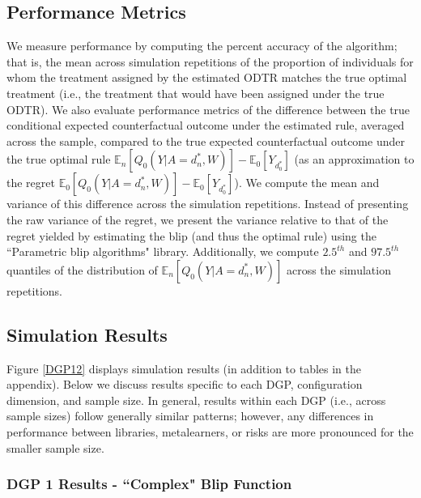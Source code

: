 \documentclass[a4paper,12pt]{article}
\begin{document}
\subsection{Performance Metrics}
We measure performance by computing the percent accuracy of the algorithm; that is, the mean across simulation repetitions of the proportion of individuals for whom the treatment assigned by the estimated ODTR matches the true optimal treatment (i.e., the treatment that would have been assigned under the true ODTR). We also evaluate performance metrics of the difference between the true conditional expected counterfactual outcome under the estimated rule, averaged across the sample, compared to the true expected counterfactual outcome under the true optimal rule  $\mathbb{E}_n[Q_0(Y|A=d_n^*,W)] - \mathbb{E}_0 [Y_{d_0^*}]$ (as an approximation to the regret $\mathbb{E}_0[Q_0(Y|A=d_n^*,W)] - \mathbb{E}_0 [Y_{d_0^*}]$). We compute the mean and variance of this difference across the simulation repetitions. Instead of presenting the raw variance of the regret, we present the variance relative to that of the regret yielded by estimating the blip (and thus the optimal rule) using the ``Parametric blip algorithms" library. Additionally, we compute $2.5^{th}$ and $97.5^{th}$ quantiles of the distribution of $\mathbb{E}_n[Q_0(Y|A=d_n^*,W)]$ across the simulation repetitions. %



\subsection{Simulation Results}

Figure \ref{DGP12} displays simulation results (in addition to tables in the appendix). Below we discuss results specific to each DGP,  configuration dimension, and sample size. In general, results within each DGP (i.e., across sample sizes) follow generally similar patterns; however, any differences in performance between libraries, metalearners, or risks are more pronounced for the smaller sample size. %



\subsubsection{DGP 1 Results - ``Complex" Blip Function}
\end{document}
